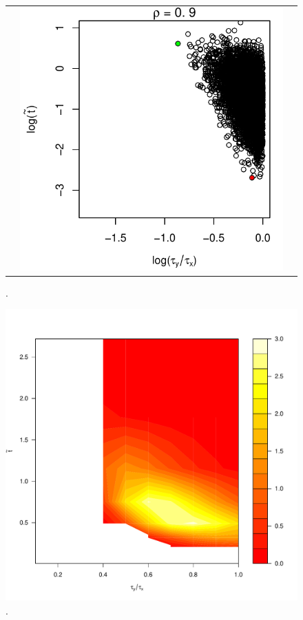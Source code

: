 \documentclass[10pt]{article}
\begin{document}
\begin{enumerate}
\begin{figure}
\begin{tabular}{ccc}
\begin{minipage}{0.3\textwidth}
    \end{minipage}
    & \begin{minipage}{0.3\textwidth}
      \centering
      \includegraphics[width=1\linewidth]{small-sigma-t-scatterplot-09.pdf}
    \end{minipage}
  \end{tabular}
  \caption{.}
  \label{fig:small-sigma-y-t-samples}
\end{figure}

\begin{figure}
  \centering
  \includegraphics[scale=0.3]{small-sigma-Galerkin-no-filter-rho-09.pdf}
  \caption{.}
  \label{fig:rho-09}
\end{figure}


\end{enumerate}
\end{document}
